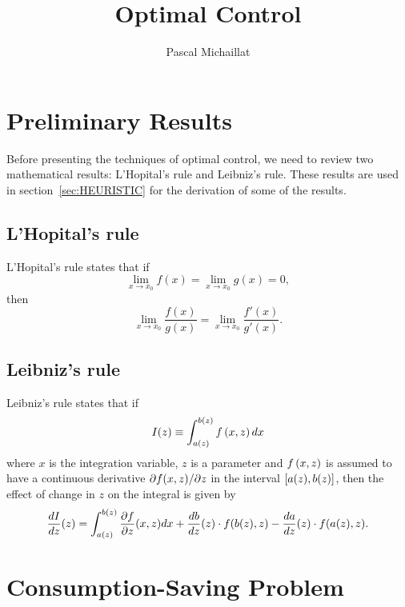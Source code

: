\documentclass[letterpaper,12pt,leqno]{article}
\begin{document}
\title{Optimal Control}
\author{Pascal Michaillat}
\date{}

\begin{titlepage}
\maketitle
\tableofcontents
\end{titlepage}

\section{Preliminary Results}

Before presenting the techniques of optimal control, we need to review two mathematical results: L'Hopital's rule and Leibniz's rule. These results are used in section~\ref{sec:HEURISTIC} for the derivation of some of the results.

\subsection{L'Hopital's rule}

L'Hopital's rule states that if 
\begin{equation*}
\lim_{x\to x_{0}}f(x) =\lim_{x\to x_{0}}g(x) =0,
\end{equation*}
then 
\begin{equation*}
\lim_{x\to x_{0}}\frac{f(x)}{g(x)}=\lim_{x\to x_{0}}\frac{f'(x) }{g'(x)}.
\end{equation*}

\subsection{Leibniz's rule}

Leibniz's rule states that if
\begin{equation*}
I(z) \equiv \int_{a(z) }^{b(z)}f\left( x,z \right) dx
\end{equation*}
where $x$ is the integration variable, $z$ is a parameter and $f\left(  x,z \right) $
is assumed to have a continuous derivative $\partial f(x,z)/\partial z$ in the
interval $\left[ a(z),b(z) \right]$, then the effect of change in $z$ on the integral is given by
\begin{equation*}
\frac{d I}{d z}(z) =\int_{a(z)}^{b(z)} \frac{\partial f}{\partial z}(x,z) dx+\frac{d b}{d z}(z) \cdot f( b(z),z) -\frac{d a}{d z}(z) \cdot f(a(z) ,z).
\end{equation*}

\section{Consumption-Saving Problem}
\end{document}
